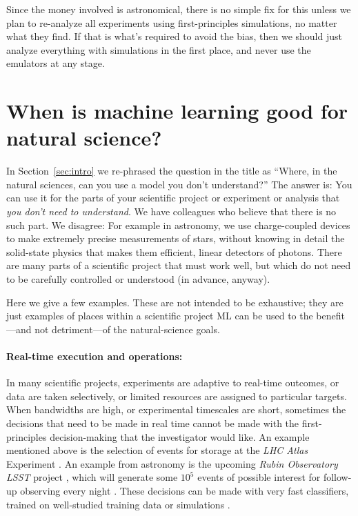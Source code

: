 \documentclass[10pt]{article}
\newcommand{\sectionname}{Section}
\begin{document}
Since the money involved is astronomical, there is no simple fix for this unless we plan to re-analyze all experiments using first-principles simulations, no matter what they find.
If that is what's required to avoid the bias, then we should just analyze everything with simulations in the first place, and never use the emulators at any stage.

\section{When is machine learning good for natural science?}\label{sec:good}
In \sectionname~\ref{sec:intro} we re-phrased the question in the title as
``Where, in the natural sciences, can you use a model you don't understand?''
The answer is: You can use it for the parts of your scientific project or experiment or analysis that \emph{you don't need to understand}.
We have colleagues who believe that there is no such part.
We disagree: For example in astronomy, we use charge-coupled devices to make extremely precise measurements of stars, without knowing in detail the solid-state physics that makes them efficient, linear detectors of photons.
There are many parts of a scientific project that must work well, but which do not need to be carefully controlled or understood (in advance, anyway).

Here we give a few examples.
These are not intended to be exhaustive; they are just examples of places within a scientific project ML can be used to the benefit---and not detriment---of the natural-science goals.

\paragraph{Real-time execution and operations:}
In many scientific projects, experiments are adaptive to real-time outcomes, or data are taken selectively, or limited resources are assigned to particular targets.
When bandwidths are high, or experimental timescales are short, sometimes the decisions that need to be made in real time cannot be made with the first-principles decision-making that the investigator would like.
An example mentioned above is the selection of events for storage at the \textsl{LHC Atlas} Experiment \cite{atlas}.
An example from astronomy is the upcoming \textsl{Rubin Observatory LSST} project \cite{rubin}, which will generate some $10^5$ events of possible interest for follow-up observing every night \cite{lsst_events}.
These decisions can be made with very fast classifiers, trained on well-studied training data or simulations \cite{lsst_broker, atlas_trigger}.
\end{document}
